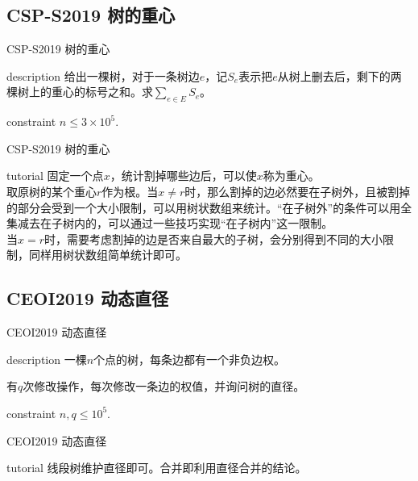 \documentclass{beamer}
\begin{document}
\subsection{CSP-S2019 树的重心}
\begin{frame}{CSP-S2019 树的重心}
	\begin{block}{description}
		给出一棵树，对于一条树边$e$，记$S_e$表示把$e$从树上删去后，剩下的两棵树上的重心的标号之和。求$\sum_{e \in E}S_e$。
	\end{block}
	\begin{block}{constraint}
		$n \le 3 \times 10^5.$
	\end{block}
\end{frame}
\begin{frame}{CSP-S2019 树的重心}
	\begin{block}{tutorial}
		固定一个点$x$，统计割掉哪些边后，可以使$x$称为重心。\\
		
		取原树的某个重心$r$作为根。当$x \neq r$时，那么割掉的边必然要在子树外，且被割掉的部分会受到一个大小限制，可以用树状数组来统计。“在子树外”的条件可以用全集减去在子树内的，可以通过一些技巧实现“在子树内”这一限制。\\
		
		当$x = r$时，需要考虑割掉的边是否来自最大的子树，会分别得到不同的大小限制，同样用树状数组简单统计即可。
	\end{block}
\end{frame}

\subsection{CEOI2019 动态直径}
\begin{frame}{CEOI2019 动态直径}
	\begin{block}{description}
		一棵$n$个点的树，每条边都有一个非负边权。
		
		有$q$次修改操作，每次修改一条边的权值，并询问树的直径。
	\end{block}
	\begin{block}{constraint}
		$n, q \le 10^5.$
	\end{block}
\end{frame}
\begin{frame}{CEOI2019 动态直径}
	\begin{block}{tutorial}
		线段树维护直径即可。合并即利用直径合并的结论。
	\end{block}
\end{frame}
\end{document}
